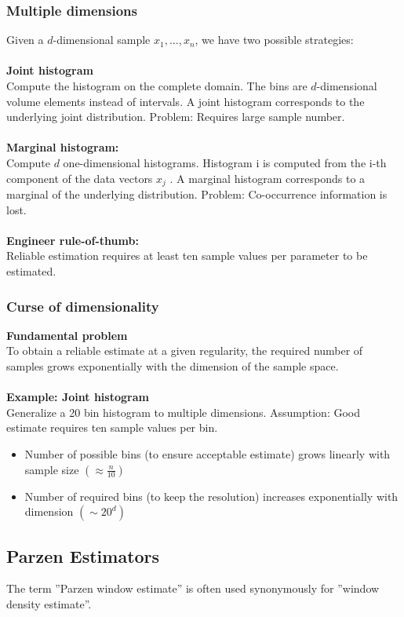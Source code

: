 \documentclass[main]{subfiles}
\begin{document}
\subsubsection{Multiple dimensions}
Given a $d$-dimensional sample $x_1,. . . ,x_n$, we have two possible strategies:\\\\
\textbf{Joint histogram}\\
 Compute the histogram on the complete
domain. The bins are $d$-dimensional volume
elements instead of intervals. A joint histogram
corresponds to the underlying joint distribution.
Problem: Requires large sample number.\\\\
\textbf{Marginal histogram:}\\
Compute $d$ one-dimensional histograms.
Histogram i is computed from the i-th component
of the data vectors $x_j$ . A marginal histogram
corresponds to a marginal of the underlying
distribution. Problem: Co-occurrence information
is lost.\\\\
\textbf{Engineer rule-of-thumb:}\\
Reliable estimation requires at least
ten sample values per parameter to be estimated.

\subsubsection{Curse of dimensionality}
\textbf{Fundamental problem}\\
To obtain a reliable estimate at a given
regularity, the required number of samples grows
exponentially with the dimension of the sample
space.\\\\
\textbf{Example: Joint histogram}\\
Generalize a 20 bin histogram to
multiple dimensions. Assumption: Good estimate
requires ten sample values per bin.
\begin{itemize}
\item Number of possible bins (to ensure
acceptable estimate) grows linearly with
sample size $(\approx \frac{n}{10})$
\item Number of required bins (to keep the
resolution) increases exponentially with
dimension $(\sim 20^d)$

\end{itemize}



\subsection{Parzen Estimators}
The term ”Parzen window estimate” is often used synonymously for ”window density estimate”.
\end{document}
